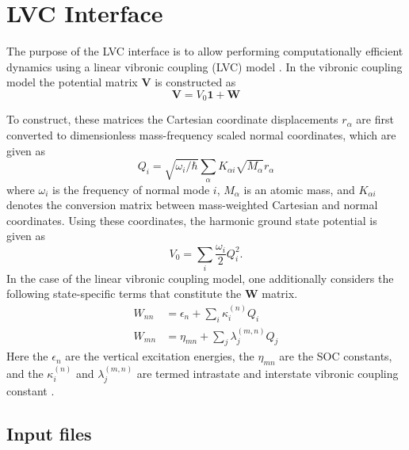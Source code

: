 \documentclass[a4paper,10pt,DIV=15,openany,twoside=false]{scrbook}
\begin{document}

\section{LVC Interface}\label{sec:int:lvc}

The purpose of the LVC interface is to allow performing computationally efficient dynamics using a linear vibronic coupling (LVC) model \cite{Koeppel84ACP}.
In the vibronic coupling model the potential matrix $\mathbf{V}$ is constructed as
%
%
\begin{equation}
\label{eq:V}
\mathbf{V}=
V_0\mathbf{1}+\mathbf{W}
\end{equation}

To construct, these matrices the Cartesian coordinate displacements $r_{\alpha}$ are first converted to dimensionless mass-frequency scaled normal coordinates, which are given as
%
\begin{equation}
\label{eq:Qi}
Q_i=\sqrt{\omega_i/\hbar}\sum_\alpha K_{\alpha i}\sqrt{M_\alpha}r_{\alpha}
\end{equation}
%
where $\omega_i$ is the frequency of normal mode $i$, $M_\alpha$ is an atomic mass, and $K_{\alpha i}$ denotes the conversion matrix between mass-weighted Cartesian and normal coordinates.
Using these coordinates, the harmonic ground state potential is given as
%
\begin{equation}
\label{eq:V0Qi}
V_0= \sum_i \dfrac{\omega_i}{2}Q_i^2
.
\end{equation}
%
In the case of the linear vibronic coupling model, one additionally considers the following state-specific terms that constitute the $\mathbf{W}$ matrix.
%
\begin{align}
\label{eq:Wnn}
W_{nn}&=\epsilon_n + \sum_i\kappa_i^{(n)}Q_i\\
\label{eq:Wmn}
W_{mn}&=\eta_{mn}+\sum_j\lambda_j^{(m,n)}Q_j
\end{align}
%
Here the $\epsilon_n$ are the vertical excitation energies, the $\eta_{mn}$ are the SOC constants, and the $\kappa_i^{(n)}$ and $\lambda_j^{(m,n)}$ are termed intrastate and interstate vibronic coupling constant \cite{Koppel1984ACP}.

\subsection{Input files}
\end{document}
